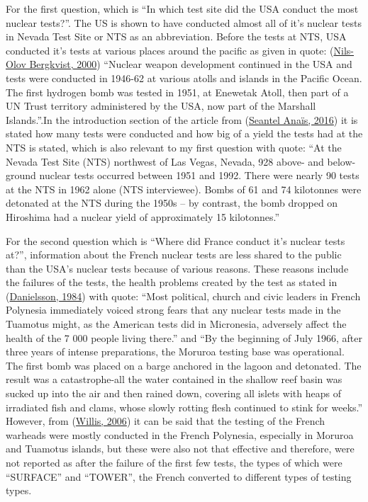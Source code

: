 \documentclass[
  12pt,
]{article}
\begin{document}
For the first question, which is ``In which test site did the USA conduct the most nuclear tests?''. The US is shown to have conducted almost all of it's nuclear tests in Nevada Test Site or NTS as an abbreviation. Before the tests at NTS, USA conducted it's tests at various places around the pacific as given in quote: (\protect\hyperlink{ref-bergkvist:2000}{Nils-Olov Bergkvist, 2000}) ``Nuclear weapon development continued in the USA and tests were conducted in 1946-62 at various atolls and islands in the Pacific Ocean. The first hydrogen bomb was tested in 1951, at Enewetak Atoll, then part of a UN Trust territory administered by the USA, now part of the Marshall Islands.''.In the introduction section of the article from (\protect\hyperlink{ref-anauxefs:2016}{Seantel Anaïs, 2016}) it is stated how many tests were conducted and how big of a yield the tests had at the NTS is stated, which is also relevant to my first question with quote: ``At the Nevada Test Site (NTS) northwest of Las Vegas, Nevada, 928 above- and below-ground nuclear tests occurred between 1951 and 1992. There were nearly 90 tests at the NTS in 1962 alone (NTS interviewee). Bombs of 61 and 74 kilotonnes were detonated at the NTS during the 1950s -- by contrast, the bomb dropped on Hiroshima had a nuclear yield of approximately 15 kilotonnes.''

For the second question which is ``Where did France conduct it's nuclear tests at?'', information about the French nuclear tests are less shared to the public than the USA's nuclear tests because of various reasons. These reasons include the failures of the tests, the health problems created by the test as stated in (\protect\hyperlink{ref-danielsson:1984}{Danielsson, 1984}) with quote: ``Most political, church and civic leaders in French Polynesia immediately voiced strong fears that any nuclear tests made in the Tuamotus might, as the American tests did in Micronesia, adversely affect the health of the 7 000 people living there.'' and ``By the beginning of July 1966, after three years of intense preparations, the Moruroa testing base was operational. The first bomb was placed on a barge anchored in the lagoon and detonated. The result was a catastrophe-all the water contained in the shallow reef basin was sucked up into the air and then rained down, covering all islets with heaps of irradiated fish and clams, whose slowly rotting flesh continued to stink for weeks.'' However, from (\protect\hyperlink{ref-willis:2006}{Willis, 2006}) it can be said that the testing of the French warheads were mostly conducted in the French Polynesia, especially in Moruroa and Tuamotus islands, but these were also not that effective and therefore, were not reported as after the failure of the first few tests, the types of which were ``SURFACE'' and ``TOWER'', the French converted to different types of testing types.
\end{document}
